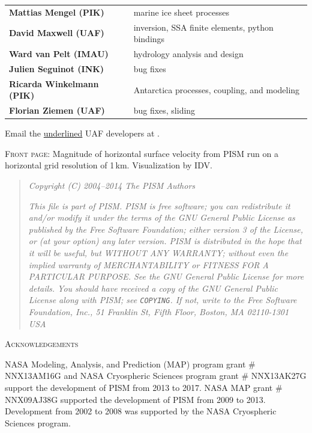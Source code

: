 \documentclass[titlepage,letterpaper,final]{scrartcl}
\begin{document}
\begin{tabular}{ll}
\textbf{Mattias Mengel (PIK)} & marine ice sheet processes \\
\textbf{David Maxwell (UAF)} & inversion, SSA finite elements, python bindings \\
\textbf{Ward van Pelt (IMAU)} & hydrology analysis and design \\
\textbf{Julien Seguinot (INK)} & bug fixes \\
\textbf{Ricarda Winkelmann (PIK)} & Antarctica processes, coupling, and modeling  \\
\textbf{Florian Ziemen (UAF)} & bug fixes, sliding \\
\end{tabular}

\bigskip
\noindent Email the \underline{underlined} UAF developers at \qquad \PISMEMAIL.

\bigskip\bigskip
\noindent \textsc{Front page}:  Magnitude of horizontal surface velocity from PISM run on a horizontal grid resolution of 1\,km.  Visualization by IDV.

\vfill

\newpage
\vspace{0.2in}
\begin{quote}
\textsl{Copyright (C) 2004--2014 The PISM Authors}
\medskip

\noindent \textsl{This file is part of PISM.  PISM is free software; you can redistribute it and/or modify it under the terms of the GNU General Public License as published by the Free Software Foundation; either version 3 of the License, or (at your option) any later version.  PISM is distributed in the hope that it will be useful, but WITHOUT ANY WARRANTY; without even the implied warranty of MERCHANTABILITY or FITNESS FOR A PARTICULAR PURPOSE.  See the GNU General Public License for more details.  You should have received a copy of the GNU General Public License along with PISM; see \emph{\texttt{COPYING}}.  If not, write to the Free Software Foundation, Inc., 51 Franklin St, Fifth Floor, Boston, MA  02110-1301 USA}
\end{quote}
\vspace{0.5in}

\centerline{\textsc{Acknowledgements}}
\bigskip

\small
NASA Modeling, Analysis, and Prediction (MAP) program grant \# NNX13AM16G and NASA Cryospheric Sciences program grant \# NNX13AK27G support the development of PISM from 2013 to 2017.  NASA MAP grant \# NNX09AJ38G supported the development of PISM from 2009 to 2013.  Development from 2002 to 2008 was supported by the NASA Cryospheric Sciences program.
\end{document}
